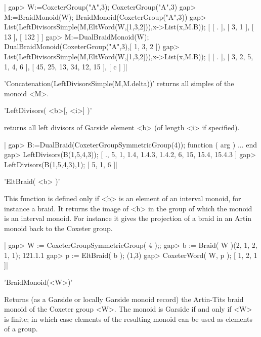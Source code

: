 |    gap> W:=CoxeterGroup("A",3);
    CoxeterGroup("A",3)
    gap> M:=BraidMonoid(W);
    BraidMonoid(CoxeterGroup("A",3))
    gap> List(LeftDivisorsSimple(M,EltWord(W,[1,3,2])),x->List(x,M.B));
    [ [ . ], [ 3, 1 ], [ 13 ], [ 132 ] ]
    gap> M:=DualBraidMonoid(W);
    DualBraidMonoid(CoxeterGroup("A",3),[ 1, 3, 2 ])
    gap> List(LeftDivisorsSimple(M,EltWord(W,[1,3,2])),x->List(x,M.B));
    [ [ . ], [ 3, 2, 5, 1, 4, 6 ], [ 45, 25, 13, 34, 12, 15 ], [ c ] ]|

'Concatenation(LeftDivisorsSimple(M,M.delta))'  returns all  simples of the
monoid <M>.


'LeftDivisors( <b>[, <i>] )'

returns all left divisors of Garside element <b> (of length <i> if specified). 

|    gap> B:=DualBraid(CoxeterGroupSymmetricGroup(4));
    function ( arg ) ... end
    gap> LeftDivisors(B(1,5,4,3));
    [ ., 5, 1, 1.4, 1.4.3, 1.4.2, 6, 15, 15.4, 15.4.3 ]
    gap> LeftDivisors(B(1,5,4,3),1);
    [ 5, 1, 6 ]|


'EltBraid( <b> )'

This  function is defined only if <b>  is an element of an interval monoid,
for instance a braid. It returns the image of <b> in the group of which the
monoid  is an interval  monoid. For instance  it gives the  projection of a
braid in an Artin monoid back to the Coxeter group.

|    gap>  W := CoxeterGroupSymmetricGroup( 4 );;
    gap>  b := Braid( W )(2, 1, 2, 1, 1);
    121.1.1
    gap> p := EltBraid( b );
    (1,3)
    gap> CoxeterWord( W, p );
    [ 1, 2, 1 ]|


'BraidMonoid(<W>)'

Returns (as a  Garside or locally Garside monoid  record) the Artin-Tits
braid monoid of the Coxeter group <W>. The monoid is Garside if and only
if <W> is finite; in which case  elements of the resulting monoid can be
used as elements of a group.


